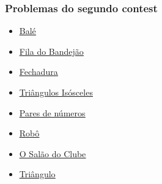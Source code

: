 \documentclass{beamer}
\begin{document}
	\begin{frame}
	\frametitle{Problemas do segundo contest}
	\begin{itemize}
	\item \textcolor{blue}{\underline{\href{https://www.urionlinejudge.com.br/judge/pt/problems/view/2400}{Balé}}}
	\item \textcolor{blue}{\underline{\href{https://www.urionlinejudge.com.br/judge/pt/problems/view/1524}{Fila do Bandejão}}}
	\item \textcolor{blue}{\underline{\href{https://www.urionlinejudge.com.br/judge/pt/problems/view/2449}{Fechadura}}}
	\item \textcolor{blue}{\underline{\href{https://www.urionlinejudge.com.br/judge/pt/problems/view/1378}{Triângulos Isósceles}}}
	\item \textcolor{blue}{\underline{\href{https://www.urionlinejudge.com.br/judge/pt/problems/view/3059}{Pares de números}}}
	\item \textcolor{blue}{\underline{\href{https://www.urionlinejudge.com.br/judge/pt/problems/view/2436}{Robô}}}
	\item \textcolor{blue}{\underline{\href{https://www.urionlinejudge.com.br/judge/pt/problems/view/1086}{O Salão do Clube}}}
	\item \textcolor{blue}{\underline{\href{https://www.urionlinejudge.com.br/judge/pt/problems/view/1929}{Triângulo}}}
	\end{itemize}
	\end{frame}
\end{document}
